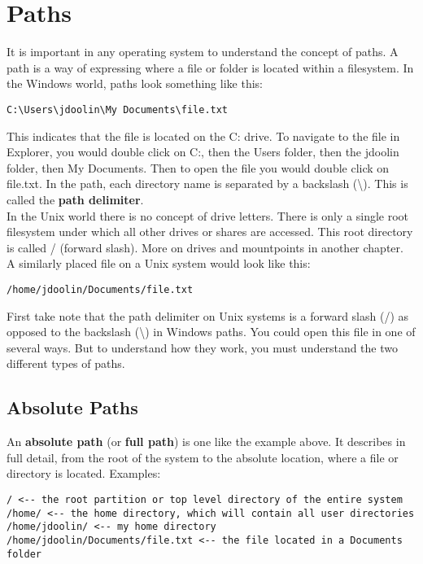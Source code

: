 \section{Paths}

It is important in any operating system to understand the concept of paths.  A path is a way of expressing where a file or folder is located within a filesystem.  In the Windows world, paths look something like this:

\begin{verbatim}
C:\Users\jdoolin\My Documents\file.txt
\end{verbatim}

This indicates that the file is located on the C: drive.  To navigate to the file in Explorer, you would double click on C:, then the Users folder, then the jdoolin folder, then My Documents.  Then to open the file you would double click on file.txt.  In the path, each directory name is separated by a backslash (\textbackslash).  This is called the \textbf{path delimiter}.\\

In the Unix world there is no concept of drive letters.  There is only a single root filesystem under which all other drives or shares are accessed.  This root directory is called / (forward slash).  More on drives and mountpoints in another chapter.\\

A similarly placed file on a Unix system would look like this:

\begin{verbatim}
/home/jdoolin/Documents/file.txt
\end{verbatim}

First take note that the path delimiter on Unix systems is a forward slash (/) as opposed to the backslash (\textbackslash) in Windows paths.  You could open this file in one of several ways.  But to understand how they work, you must understand the two different types of paths.

\subsection{Absolute Paths}

An \textbf{absolute path} (or \textbf{full path}) is one like the example above.  It describes in full detail, from the root of the system to the absolute location, where a file or directory is located.  Examples:

\begin{verbatim}
/ <-- the root partition or top level directory of the entire system
/home/ <-- the home directory, which will contain all user directories
/home/jdoolin/ <-- my home directory
/home/jdoolin/Documents/file.txt <-- the file located in a Documents folder 
\end{verbatim}

